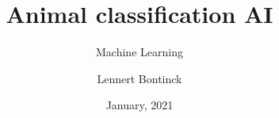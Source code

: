 \title{Animal classification AI}
\subtitle{Machine Learning}
\author{Lennert Bontinck}
\date{January, 2021}
